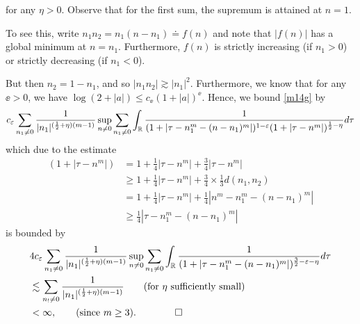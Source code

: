 %
for any $\eta >0$.
Observe that for the first sum, the supremum is attained at $n=1$.
%
%
\begin{framed}
\begin{remark}
To see this,
write $n_1 n_2 = n_1(n-n_1) \doteq f(n)$ and note that $|f(n)|$ has a global
minimum at $n=n_1$. Furthermore, $f(n)$ is strictly
increasing (if $n_1>0$) or strictly decreasing (if $n_1 <0$).
\end{remark}
\end{framed}
%
%
%
But then $n_2 = 1 - n_1$, and so $| n_1 n_2 | \gtrsim | n_1 |^2$. Furthermore, we know that 
for any $\ee > 0$, we have $\log (2 + | a |) \le c_{\ee}(1 + | a
|)^{\ee}$. Hence, we bound \eqref{m14g} by
%
%
%
%
\begin{equation*}
	\begin{split}
		c_{\varepsilon}  \sum_{n_1 \neq 0} \frac{1}{|n_1|^{(\frac{1}{2} + \eta)(m-1)}}
		\sup_{n \neq 0} \sum_{n_1 \neq 0} \int_{\mathbb{R}} \frac{1}{(1 +
		| \tau - n_{1}^m - (n - n_{1})^m |)^{1- \varepsilon}(1 + | \tau - n^m
		|)^{\frac{1}{2}-\eta}} d \tau
	\end{split}
\end{equation*}
%
%
%
which due to the estimate
%
%
\begin{equation}
	\label{m16g}
	\begin{split}
		(1 + | \tau - n^m |)
		& = 1 + \frac{1}{4}| \tau - n^m | + \frac{3}{4}| \tau - n^m |
		\\
		& \ge 1 + \frac{1}{4}| \tau - n^m | + \frac{3}{4} \times
		\frac{1}{3}d(n_1,n_2)
		\\
		& = 1 + \frac{1}{4}| \tau - n^m | + \frac{1}{4}| n^m - n_1^m - (n -
		n_1)^m |
		\\
		& \ge \frac{1}{4}| \tau - n_1^m - (n - n_1)^m |
	\end{split}
\end{equation}
%
%
is bounded by
%
%
\begin{equation}
	\label{m15g}
	\begin{split}
		& 4 c_{\ee} \sum_{n_1 \neq 0} \frac{1}{| n_1 |^{(\frac{1}{2} +
		\eta)(m-1)}} 	\sup_{n \neq 0} \sum_{n_1 \neq 0}	\int_{\rr} \frac{1}{(1 + |
		\tau - n_{1}^m - (n - n_{1})^m |)^{\frac{3}{2}-\ee - \eta}} d \tau
		\\
		& \lesssim \sum_{n_! \neq 0} \frac{1}{| n_1 |^{(\frac{1}{2} +
		\eta)(m-1)}} 		\qquad (\text{for} \ \eta \ \text{sufficiently small})
		\\
		& < \infty, \qquad (\text{since} \ m \ge 3). \qquad \qed
	\end{split}
\end{equation}
%
%
%
%
%
%
